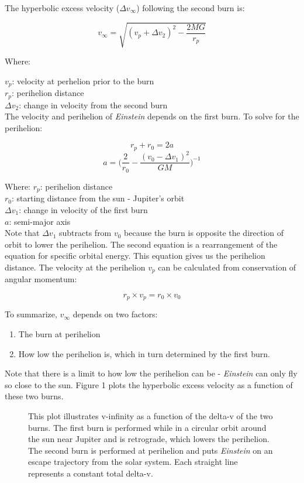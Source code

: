 \documentclass[12pt]{article} %
\begin{document}
The hyperbolic excess velocity ($\Delta v_{\infty}$) following the second burn is:

$$v_{\infty} = \sqrt{(v_p + \Delta v_2)^2-\frac{2MG}{r_p}}$$

Where:

$v_p$: velocity at perhelion prior to the burn\\
$r_p$: perihelion distance\\
$\Delta v_2$: change in velocity from the second burn\\

The velocity and perihelion of \textit{Einstein} depends on the first burn. To solve for the perihelion:

$$r_p + r_0 = 2a$$
$$a = \bigg(\frac{2}{r_0} - \frac{(v_0-\Delta v_1)^2}{GM}\bigg)^{-1}$$

Where:
$r_p$: perihelion distance\\
$r_0$: starting distance from the sun - Jupiter's orbit\\
$\Delta v_1$: change in velocity of the first burn\\
$a$: semi-major axis\\

Note that $\Delta v_1$ subtracts from $v_0$ because the burn is opposite the direction of orbit to lower the perihelion. The second equation is a rearrangement of the equation for specific orbital energy. This equation gives us the perihelion distance. The velocity at the perihelion $v_p$ can be calculated from conservation of angular momentum:

$$r_p \times v_p = r_0 \times v_0$$

To summarize, $v_{\infty}$ depends on two factors: 

\begin{enumerate}
\item The burn at perihelion
\item How low the perihelion is, which in turn determined by the first burn. 
\end{enumerate}

Note that there is a limit to how low the perihelion can be - \textit{Einstein} can only fly so close to the sun. Figure 1 plots the hyperbolic excess velocity as a function of these two burns.

\begin{figure}
\caption{This plot illustrates v-infinity as a function of the delta-v of the two burns. The first burn is performed while in a circular orbit around the sun near Jupiter and is retrograde, which lowers the perihelion. The second burn is performed at perihelion and puts \textit{Einstein} on an escape trajectory from the solar system. Each straight line represents a constant total delta-v.}
\end{figure}
\end{document}
